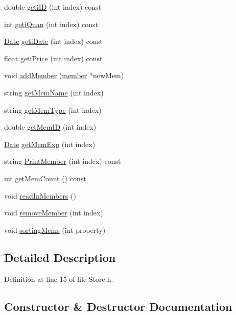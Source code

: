 \begin{DoxyCompactItemize}
\item 
double \hyperlink{class_store_a641cde6a581b24d767f357ebd98165a4}{geti\+ID} (int index) const 
\item 
int \hyperlink{class_store_a411a0fb5dad295af0a08de9403505a3d}{geti\+Quan} (int index) const 
\item 
\hyperlink{class_date}{Date} \hyperlink{class_store_a72f3999457e8732dbc1a0d1861431172}{geti\+Date} (int index) const 
\item 
float \hyperlink{class_store_a28987359c2741e0e9df19a3f6e38d064}{geti\+Price} (int index) const 
\item 
void \hyperlink{class_store_a62931cf3a150aefd0b0ce05212345448}{add\+Member} (\hyperlink{classmember}{member} $\ast$new\+Mem)
\item 
string \hyperlink{class_store_a9aeed6b6fac575e526a6d5f002445534}{get\+Mem\+Name} (int index)
\item 
string \hyperlink{class_store_a50eddaad286a52ee7f90f8cf9729170a}{get\+Mem\+Type} (int index)
\item 
double \hyperlink{class_store_a87ba2477a5de7c3f97261004814e8193}{get\+Mem\+ID} (int index)
\item 
\hyperlink{class_date}{Date} \hyperlink{class_store_a5e9cb9b4fef77f56eb398eff7323c5e4}{get\+Mem\+Exp} (int index)
\item 
string \hyperlink{class_store_ace497ab836b1b7af6d27b67bf447ae24}{Print\+Member} (int index) const 
\item 
int \hyperlink{class_store_a3dd4da9b6b856f00543bae3a19e9aed5}{get\+Mem\+Count} () const 
\item 
void \hyperlink{class_store_ae8c37df9579bd4bd6683acd22ef190cb}{read\+In\+Members} ()
\item 
void \hyperlink{class_store_af426a992d593aa8b2e97a6e85a9cf513}{remove\+Member} (int index)
\item 
void \hyperlink{class_store_a4558cc3d3c991e734e36001d156913b3}{sorting\+Mems} (int property)
\end{DoxyCompactItemize}


\subsection{Detailed Description}


Definition at line 15 of file Store.\+h.



\subsection{Constructor \& Destructor Documentation}
